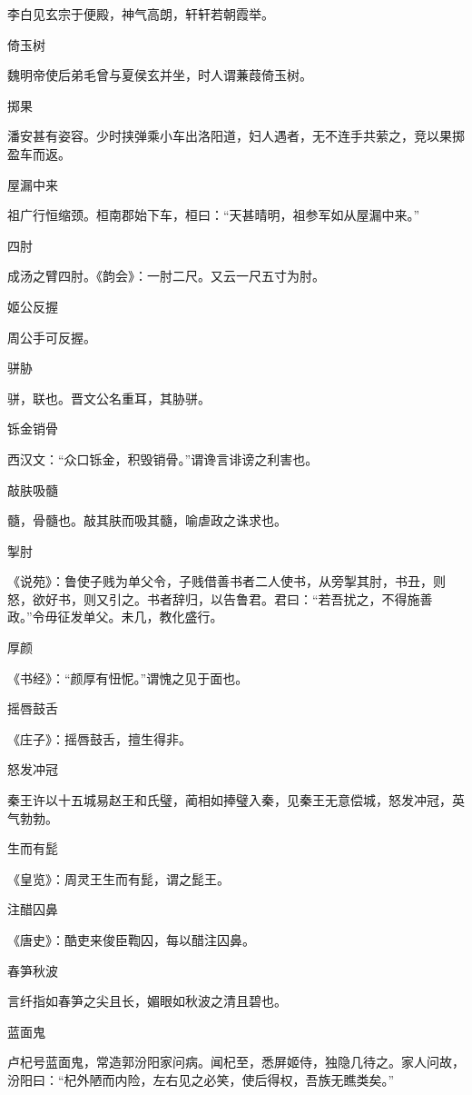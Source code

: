 \documentclass[a4paper,12pt,UTF8,twoside]{ctexbook}
\begin{document}
    李白见玄宗于便殿，神气高朗，轩轩若朝霞举。
    
    倚玉树
    
    魏明帝使后弟毛曾与夏侯玄并坐，时人谓蒹葭倚玉树。
    
    掷果
    
    潘安甚有姿容。少时挟弹乘小车出洛阳道，妇人遇者，无不连手共萦之，竞以果掷盈车而返。
    
    屋漏中来
    
    祖广行恒缩颈。桓南郡始下车，桓曰：“天甚晴明，祖参军如从屋漏中来。”
    
    四肘
    
    成汤之臂四肘。《韵会》：一肘二尺。又云一尺五寸为肘。
    
    姬公反握
    
    周公手可反握。
    
    骈胁
    
    骈，联也。晋文公名重耳，其胁骈。
    
    铄金销骨
    
    西汉文：“众口铄金，积毁销骨。”谓谗言诽谤之利害也。
    
    敲肤吸髓
    
    髓，骨髓也。敲其肤而吸其髓，喻虐政之诛求也。
    
    掣肘
    
    《说苑》：鲁使子贱为单父令，子贱借善书者二人使书，从旁掣其肘，书丑，则怒，欲好书，则又引之。书者辞归，以告鲁君。君曰：“若吾扰之，不得施善政。”令毋征发单父。未几，教化盛行。
    
    厚颜
    
    《书经》：“颜厚有忸怩。”谓愧之见于面也。
    
    摇唇鼓舌
    
    《庄子》：摇唇鼓舌，擅生得非。
    
    怒发冲冠
    
    秦王许以十五城易赵王和氏璧，蔺相如捧璧入秦，见秦王无意偿城，怒发冲冠，英气勃勃。
    
    生而有髭
    
    《皇览》：周灵王生而有髭，谓之髭王。
    
    注醋囚鼻
    
    《唐史》：酷吏来俊臣鞫囚，每以醋注囚鼻。
    
    春笋秋波
    
    言纤指如春笋之尖且长，媚眼如秋波之清且碧也。
    
    蓝面鬼
    
    卢杞号蓝面鬼，常造郭汾阳家问病。闻杞至，悉屏姬侍，独隐几待之。家人问故，汾阳曰：“杞外陋而内险，左右见之必笑，使后得权，吾族无瞧类矣。”
    
\end{document}
